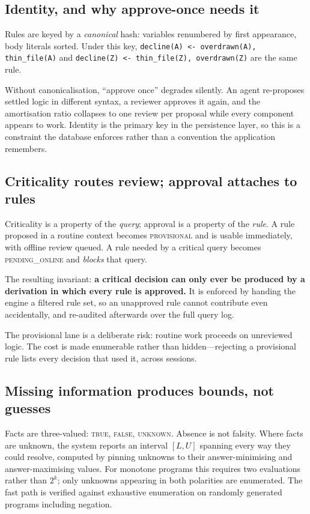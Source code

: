 \documentclass[sigconf,nonacm]{acmart}
\begin{document}
\subsection{Identity, and why approve-once needs it}

Rules are keyed by a \emph{canonical} hash: variables renumbered by first
appearance, body literals sorted. Under this key,
\lstinline|decline(A) <- overdrawn(A), thin_file(A)| and
\lstinline|decline(Z) <- thin_file(Z), overdrawn(Z)| are the same rule.

Without canonicalisation, ``approve once'' degrades silently. An agent
re-proposes settled logic in different syntax, a reviewer approves it again, and
the amortisation ratio collapses to one review per proposal while every
component appears to work. Identity is the primary key in the persistence layer,
so this is a constraint the database enforces rather than a convention the
application remembers.

\subsection{Criticality routes review; approval attaches to rules}

Criticality is a property of the \emph{query}; approval is a property of the
\emph{rule}. A rule proposed in a routine context becomes \textsc{provisional}
and is usable immediately, with offline review queued. A rule needed by a
critical query becomes \textsc{pending\_online} and \emph{blocks} that query.

The resulting invariant: \textbf{a critical decision can only ever be produced by
a derivation in which every rule is approved.} It is enforced by handing the
engine a filtered rule set, so an unapproved rule cannot contribute even
accidentally, and re-audited afterwards over the full query log.

The provisional lane is a deliberate risk: routine work proceeds on unreviewed
logic. The cost is made enumerable rather than hidden---rejecting a provisional
rule lists every decision that used it, across sessions.

\subsection{Missing information produces bounds, not guesses}

Facts are three-valued: \textsc{true}, \textsc{false}, \textsc{unknown}.
Absence is not falsity. Where facts are unknown, the system reports an interval
$[L,U]$ spanning every way they could resolve, computed by pinning unknowns to
their answer-minimising and answer-maximising values. For monotone programs this
requires two evaluations rather than $2^k$; only unknowns appearing in both
polarities are enumerated. The fast path is verified against exhaustive
enumeration on randomly generated programs including negation.
\end{document}
